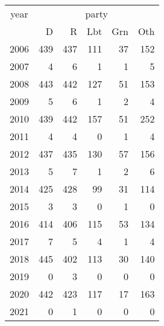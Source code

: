 \footnotesize\begin{tabular}[t]{lrrrrr}
\toprule
\multicolumn{1}{c}{year} & \multicolumn{5}{c}{party} \\
\cmidrule(l{3pt}r{3pt}){1-1} \cmidrule(l{3pt}r{3pt}){2-6}
  & D & R & Lbt & Grn & Oth\\
\midrule
2006 & 439 & 437 & 111 & 37 & 152\\
2007 & 4 & 6 & 1 & 1 & 5\\
2008 & 443 & 442 & 127 & 51 & 153\\
2009 & 5 & 6 & 1 & 2 & 4\\
2010 & 439 & 442 & 157 & 51 & 252\\
2011 & 4 & 4 & 0 & 1 & 4\\
2012 & 437 & 435 & 130 & 57 & 156\\
2013 & 5 & 7 & 1 & 2 & 6\\
2014 & 425 & 428 & 99 & 31 & 114\\
2015 & 3 & 3 & 0 & 1 & 0\\
2016 & 414 & 406 & 115 & 53 & 134\\
2017 & 7 & 5 & 4 & 1 & 4\\
2018 & 445 & 402 & 113 & 30 & 140\\
2019 & 0 & 3 & 0 & 0 & 0\\
2020 & 442 & 423 & 117 & 17 & 163\\
2021 & 0 & 1 & 0 & 0 & 0\\
\bottomrule
\end{tabular}
